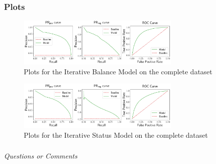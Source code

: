 \documentclass{beamer}
\begin{document}
\begin{frame}
    \frametitle{Plots}
    \begin{figure}[htp]
        \centering
        \includegraphics[width=0.7\textwidth]{../images/iterative_Balance.pdf}
        \caption{Plots for the Iterative Balance Model on the complete \wikirfa dataset}
        \label{fig:complete-iterative-balance}
    \end{figure}

    \begin{figure}[htp]
        \centering
        \includegraphics[width=0.7\textwidth]{../images/iterative_Status.pdf}
        \caption{Plots for the Iterative Status Model on the complete \wikirfa dataset}
        \label{fig:complete-iterative-status}
    \end{figure}   

\end{frame}

\begin{frame}
    \frametitle{}

    \centering \Large
    \emph{Questions or Comments}

\end{frame}



\end{document}

